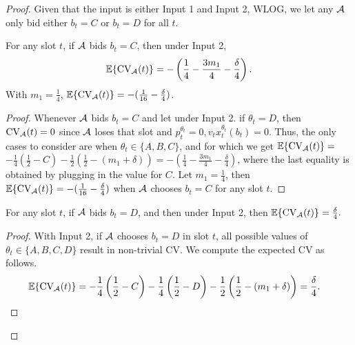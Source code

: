 \begin{proof}
Given that the input is either Input 1 and Input 2, WLOG, we let any $\mathcal{A}$ only bid either $b_t = C$ or 
$b_t=D$ for all $t$. 
\begin{lemma}\label{lem:ccvC}
For any slot $t$, if  $\mathcal{A}$ bids $b_t=C$, then under  Input 2, $${\mathbb{E}}\{\text{CV}_{\mathcal{A}}(t)\}= -\left(\frac{1}{4}-\frac{3m_1}{4}-\frac{\delta}{4}\right).$$
With $m_1=\frac{1}{4}$, ${\mathbb{E}}\{\text{CV}_{\mathcal{A}}(t)\}=-(\frac{1}{16}-\frac{\delta}{4})$.
\end{lemma}
\begin{proof}
Whenever  $\mathcal{A}$ bids $b_t=C$ and let under Input 2. if $\theta_t =D$, then  $\text{CV}_{\mathcal{A}}(t)=0$ since $\mathcal{A}$ loses that slot and $p_t^{\theta_t}=0, v_tx_t^{\theta_t}(b_t)=0$.
Thus, the only cases to consider are when $\theta_t \in \{A,B,C\}$, and for which we get ${\mathbb{E}}\{\text{CV}_{\mathcal{A}}(t)\} =$
$ - \frac{1}{4} \left(\frac{1}{2} - C\right) - \frac{1}{2}\left(\frac{1}{2}-(m_1+\delta)\right) = -\left(\frac{1}{4}-\frac{3m_1}{4}-\frac{\delta}{4}\right)$,
where the last equality is obtained by plugging in the value for $C$. 
Let $m_1=\frac{1}{4}$, then ${\mathbb{E}}\{\text{CV}_{\mathcal{A}}(t)\}=-(\frac{1}{16}-\frac{\delta}{4})$ when $\mathcal{A}$ chooses $b_t=C$ for any slot $t$.
\end{proof}


\begin{lemma}\label{lem:ccvD}
For any slot $t$, if $\mathcal{A}$ bids $b_t=D$, and then under Input 2, then ${\mathbb{E}}\{\text{CV}_{\mathcal{A}}(t)\} =\frac{\delta}{4}.$
\end{lemma}
\begin{proof}
With Input 2, if $\mathcal{A}$ chooses $b_t=D$ in slot $t$, all possible values of $\theta_t \in \{A,B,C,D\}$ result in non-trivial CV. 
We compute the expected $\text{CV}$ as follows.  
\begin{align}\nonumber
{\mathbb{E}}\{\text{CV}_{\mathcal{A}}(t)\} &= -\frac{1}{4} \left(\frac{1}{2} - C\right) - \frac{1}{4} \left(\frac{1}{2} - D\right) -   \frac{1}{2}\left(\frac{1}{2}-(m_1+\delta)\right) = \frac{\delta}{4}.
\end{align}
\end{proof}


\end{proof}
